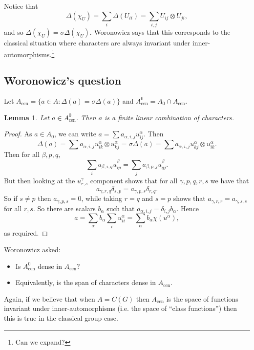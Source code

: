 \documentclass[twoside,a4paper,12pt]{article}
\theoremstyle{plain}
\newtheorem{lemma}[proposition]{Lemma}
\theoremstyle{definition}
\begin{document}
Notice that
\[ \Delta(\chi_U) = \sum_i \Delta(U_{ii})
= \sum_{i,j} U_{ij} \otimes U_{ji}, \]
and so $\Delta(\chi_U) = \sigma \Delta(\chi_U)$.  Woronowicz says that
this corresponds to the classical situation where characters are always
invariant under inner-automorphisms.\footnote{Can we expand?}

\subsection{Woronowicz's question}

\newcommand{\cen}{\operatorname{cen}}

Let $A_{\cen} = \{ a\in A : \Delta(a)=\sigma\Delta(a) \}$ and
$A^0_{\cen} = A_0 \cap A_{\cen}$.

\begin{lemma}
Let $a\in A^0_{\cen}$.  Then $a$ is a finite linear combination of characters.
\end{lemma}
\begin{proof}
As $a\in A_0$, we can write $a=\sum a_{\alpha,i,j} u^\alpha_{ij}$.
Then
\[ \Delta(a) = \sum a_{\alpha,i,j} u^\alpha_{ik} \otimes u^\alpha_{kj}
= \sigma\Delta(a)
= \sum a_{\alpha,i,j} u^\alpha_{kj} \otimes u^\alpha_{ik}. \]
Then for all $\beta,p,q$,
\[ \sum_i a_{\beta,i,q} u^\beta_{ip}
= \sum_{j} a_{\beta,p,j} u^\beta_{qj}. \]
But then looking at the $u^\gamma_{r,s}$ component shows that
for all $\gamma,p,q,r,s$ we have that
\[ a_{\gamma,r,q} \delta_{s,p} = a_{\gamma,p,s} \delta_{r,q}. \]
So if $s\not=p$ then $a_{\gamma,p,s}=0$, while taking $r=q$ and $s=p$ shows
that $a_{\gamma,r,r} = a_{\gamma,s,s}$ for all $r,s$.  So there
are scalars $b_\alpha$ such that $a_{\alpha,i,j} = \delta_{i,j} b_\alpha$.
Hence
\[ a = \sum_\alpha b_\alpha \sum_i u^\alpha_{ii}
= \sum_\alpha b_\alpha \chi(u^\alpha), \]
as required.
\end{proof}

Woronowicz asked:
\begin{itemize}
\item Is $A^0_{\cen}$ dense in $A_{\cen}$?
\item Equivalently, is the span of characters dense in $A_{\cen}$.
\end{itemize}

Again, if we believe that when $A=C(G)$ then $A_{\cen}$ is the space
of functions invariant under inner-automorphisms (i.e. the space of
``class functions'') then this is true in the classical group case.
\end{document}

